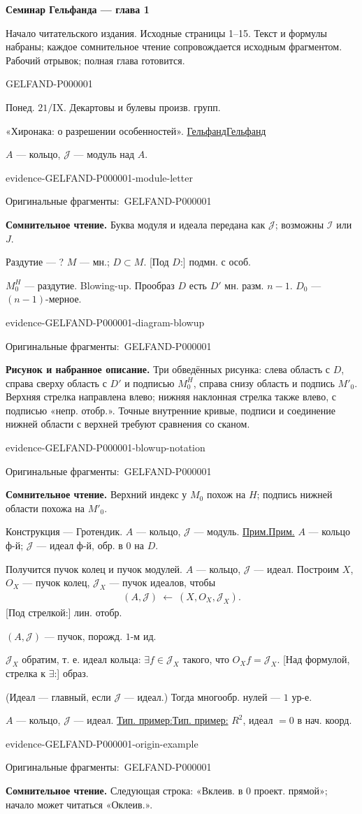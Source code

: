 \documentclass[11pt]{article}
\let\MathUnderline\underline
\renewcommand{\underline}[1]{\ifmmode\MathUnderline{#1}\else\uline{#1}\fi}
\newcommand{\SourcePage}[2]{\par\smallskip\phantomsection\label{#1:source-page}{\small\sffamily\color{blue!55!black}#1}\par\smallskip}
\newcommand{\EvidenceBlock}[4]{%
 \par\smallskip\noindent\begin{minipage}{\linewidth}
 \begin{minipage}[t]{.47\linewidth}\vspace{0pt}\centering
 \csname evidence-#1-#2\endcsname\par
 {\scriptsize\SourceCropCaption\ #1}\par
 \end{minipage}\hfill
 \begin{minipage}[t]{.49\linewidth}\vspace{0pt}\raggedright
 {\small\color{orange!65!black}\textbf{#4} #3}\par
 \end{minipage}
 \end{minipage}\par\smallskip}
\newcommand{\Unclear}[3]{\EvidenceBlock{#1}{#2}{#3}{\ReadingCaption}}
\newcommand{\SourceFigure}[3]{\EvidenceBlock{#1}{#2}{#3}{\DiagramCaption}}
\newcommand{\SourceCropCaption}{Оригинальные фрагменты:}\newcommand{\ReadingCaption}{Сомнительное чтение.}\newcommand{\IncompleteCaption}{Неразобранный фрагмент.}\newcommand{\DiagramCaption}{Рисунок и набранное описание.}
\begin{document}
{\large\bfseries Семинар Гельфанда — глава 1}\par
{\small Начало читательского издания. Исходные страницы 1–15. Текст и формулы набраны; каждое сомнительное чтение сопровождается исходным фрагментом. Рабочий отрывок; полная глава готовится.}\par\medskip
\SourcePage{GELFAND-P000001}{unlabelled}
Понед. $21/\mathrm{IX}$.
Декартовы и булевы произв. групп.

«Хиронака: о разрешении особенностей».
\underline{Гельфанд}

$A$ — кольцо, $\mathcal{J}$ — модуль над $A$.
\Unclear{GELFAND-P000001}{module-letter}{Буква модуля и идеала передана как $\mathcal{J}$; возможны $\mathcal{I}$ или $J$.}

Раздутие — ?
$M$ — мн.; $D\subset M$.
[Под $D$:] подмн. с особ.

$M_0^H$ — раздутие. Blowing-up.
Прообраз $D$ есть $D'$ мн. разм. $n-1$.
$D_0$ — $(n-1)$-мерное.
\SourceFigure{GELFAND-P000001}{diagram-blowup}{Три обведённых рисунка: слева область с $D$, справа сверху область с $D'$ и подписью $M_0^H$, справа снизу область и подпись $M'_0$. Верхняя стрелка направлена влево; нижняя наклонная стрелка также влево, с подписью «непр. отобр.». Точные внутренние кривые, подписи и соединение нижней области с верхней требуют сравнения со сканом.}
\Unclear{GELFAND-P000001}{blowup-notation}{Верхний индекс у $M_0$ похож на $H$; подпись нижней области похожа на $M'_0$.}

Конструкция — Гротендик.
$A$ — кольцо, $\mathcal{J}$ — модуль.
\underline{Прим.} $A$ — кольцо ф-й;
$\mathcal{J}$ — идеал ф-й, обр. в $0$ на $D$.

Получится пучок колец и пучок модулей.
$A$ — кольцо, $\mathcal{J}$ — идеал.
Построим $X$, $O_X$ — пучок колец,
$\mathcal{J}_X$ — пучок идеалов, чтобы
\begin{gather*}
 (A,\mathcal{J})\ \longleftarrow\ (X,O_X,\mathcal{J}_X).
\end{gather*}
[Под стрелкой:] лин. отобр.

$(A,\mathcal{J})$ — пучок, порожд. $1$-м ид.

$\mathcal{J}_X$ обратим, т. е. идеал кольца:
$\exists f\in\mathcal{J}_X$ такого, что $O_Xf=\mathcal{J}_X$.
[Над формулой, стрелка к $\exists$:] образ.

(Идеал — главный, если $\mathcal{J}$ — идеал.)
Тогда многообр. нулей — $1$ ур-е.

$A$ — кольцо, $\mathcal{J}$ — идеал.
\underline{Тип. пример:} $R^2$, идеал $=0$ в нач. коорд.
\Unclear{GELFAND-P000001}{origin-example}{Следующая строка: «Вклеив. в $0$ проект. прямой»; начало может читаться «Оклеив.».}
\end{document}
